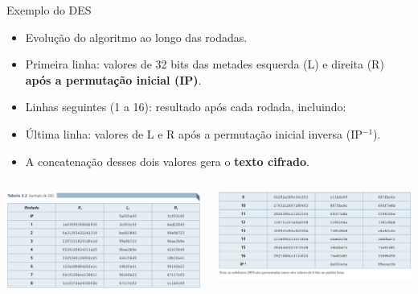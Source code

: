 \begin{frame}{Exemplo do DES}

\begin{itemize}
        \item Evolução do algoritmo ao longo das rodadas.
        \item Primeira linha: valores de 32 bits das metades esquerda (L) e direita (R) \textbf{após a permutação inicial (IP)}.
        \item Linhas seguintes (1 a 16): resultado após cada rodada, incluindo:
        
        \item Última linha: valores de L e R após a permutação inicial inversa (IP$^{-1}$).
        \item A concatenação desses dois valores gera o \textbf{texto cifrado}.
    \end{itemize}
    \begin{columns}
        \begin{column}{0.48\textwidth}
            \centering
            \includegraphics[width=\linewidth]{Figuras/des-lado1.png}

        \end{column}
        \begin{column}{0.48\textwidth}
            \centering
            \includegraphics[width=\linewidth]{Figuras/des-lado2.png}
    
        \end{column}
    \end{columns}
\end{frame}

